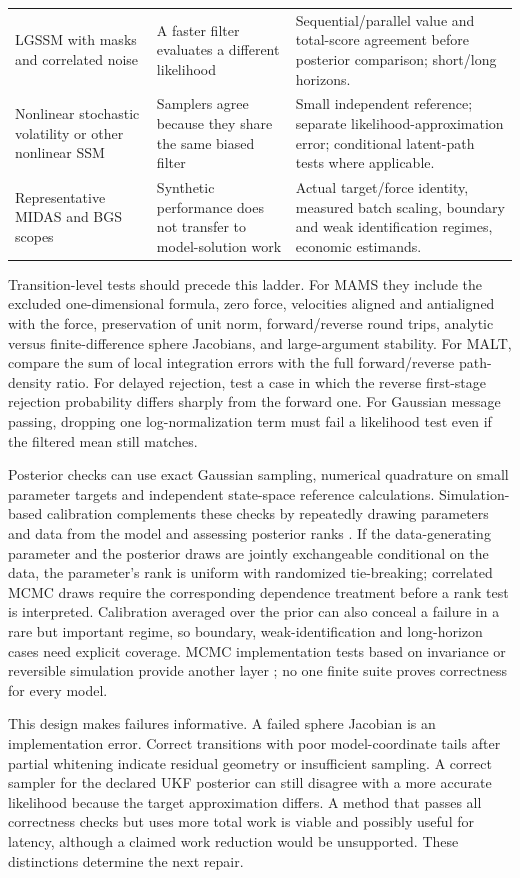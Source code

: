\begin{longtable}{>{\raggedright\arraybackslash}p{}
>{\raggedright\arraybackslash}p{}
>{\raggedright\arraybackslash}p{}}
LGSSM with masks and correlated noise &
A faster filter evaluates a different likelihood &
Sequential/parallel value and total-score agreement before posterior
comparison; short/long horizons.\\
Nonlinear stochastic volatility or other nonlinear SSM &
Samplers agree because they share the same biased filter &
Small independent reference; separate likelihood-approximation error;
conditional latent-path tests where applicable.\\
Representative MIDAS and BGS scopes &
Synthetic performance does not transfer to model-solution work &
Actual target/force identity, measured batch scaling, boundary and weak
identification regimes, economic estimands.\\
\end{longtable}

Transition-level tests should precede this ladder. For MAMS they include
the excluded one-dimensional formula, zero force, velocities aligned and
antialigned with the force, preservation of unit norm, forward/reverse
round trips, analytic versus finite-difference sphere Jacobians, and
large-argument stability. For MALT, compare the sum of local integration
errors with the full forward/reverse path-density ratio. For delayed
rejection, test a case in which the reverse first-stage rejection
probability differs sharply from the forward one. For Gaussian message
passing, dropping one log-normalization term must fail a likelihood test
even if the filtered mean still matches.

Posterior checks can use exact Gaussian sampling, numerical quadrature on
small parameter targets and independent state-space reference calculations.
Simulation-based calibration complements these checks by repeatedly drawing
parameters and data from the model and assessing posterior ranks
\citep{talts2020sbc}. If the data-generating parameter and the posterior draws
are jointly exchangeable conditional on the data, the parameter's rank is
uniform with randomized tie-breaking; correlated
MCMC draws require the corresponding dependence treatment before a rank
test is interpreted. Calibration averaged over the prior can also conceal a
failure in a rare but important regime, so boundary, weak-identification and
long-horizon cases need explicit coverage. MCMC implementation tests based on
invariance or reversible simulation provide another layer
\citep{gandy2021mcmctesting}; no one finite suite proves correctness for every
model.

This design makes failures informative. A failed sphere Jacobian is an
implementation error. Correct transitions with poor model-coordinate tails
after partial whitening indicate residual geometry or insufficient sampling.
A correct sampler for the declared UKF posterior can still disagree with a
more accurate likelihood because the target approximation differs. A method
that passes all correctness checks but uses more total work is viable and
possibly useful for latency, although a claimed work reduction would be
unsupported. These distinctions determine the next repair.

